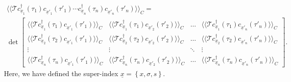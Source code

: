 \begin{multline}
\langle \langle 	\mathcal{T}   c^{\dagger}_{\underline x_{1}}(\tau_{1}) c^{\phantom\dagger}_{{\underline x}'_{1}}(\tau'_{1})  
\cdots c^{\dagger}_{\underline x_{n}}(\tau_{n}) c^{\phantom\dagger}_{{\underline x}'_{n}}(\tau'_{n}) 
\rangle \rangle_{C} = \\
\det  
\begin{bmatrix}
   \langle \langle   \mathcal{T}   c^{\dagger}_{\underline x_{1}}(\tau_{1}) c^{\phantom\dagger}_{{\underline x}'_{1}}(\tau'_{1})  \rangle \rangle_{C} & 
    \langle \langle  \mathcal{T}   c^{\dagger}_{\underline x_{1}}(\tau_{1}) c^{\phantom\dagger}_{{\underline x}'_{2}}(\tau'_{2})  \rangle \rangle_{C}  & \dots   &   
    \langle \langle   \mathcal{T}   c^{\dagger}_{\underline x_{1}}(\tau_{1}) c^{\phantom\dagger}_{{\underline x}'_{n}}(\tau'_{n})  \rangle \rangle_{C}  \\
    \langle \langle   \mathcal{T}   c^{\dagger}_{\underline x_{2}}(\tau_{2}) c^{\phantom\dagger}_{{\underline x}'_{1}}(\tau'_{1})  \rangle \rangle_{C}  & 
      \langle \langle   \mathcal{T}   c^{\dagger}_{\underline x_{2}}(\tau_{2}) c^{\phantom\dagger}_{{\underline x}'_{2}}(\tau'_{2})  \rangle \rangle_{C}  & \dots  &
       \langle \langle   \mathcal{T}   c^{\dagger}_{\underline x_{2}}(\tau_{2}) c^{\phantom\dagger}_{{\underline x}'_{n}}(\tau'_{n})  \rangle \rangle_{C}   \\
    \vdots & \vdots &  \ddots & \vdots \\
    \langle \langle   \mathcal{T}   c^{\dagger}_{\underline x_{n}}(\tau_{n}) c^{\phantom\dagger}_{{\underline x}'_{1}}(\tau'_{1})  \rangle \rangle_{C}   & 
     \langle \langle   \mathcal{T}   c^{\dagger}_{\underline x_{n}}(\tau_{n}) c^{\phantom\dagger}_{{\underline x}'_{2}}(\tau'_{2})  \rangle \rangle_{C}   & \dots  & 
     \langle \langle   \mathcal{T}   c^{\dagger}_{\underline x_{n}}(\tau_{n}) c^{\phantom\dagger}_{{\underline x}'_{n}}(\tau'_{n})  \rangle \rangle_{C}
 \end{bmatrix}.
\end{multline}
Here, we have defined the super-index $\underline{ x} = \left\{   x,\sigma,s \right\}$.